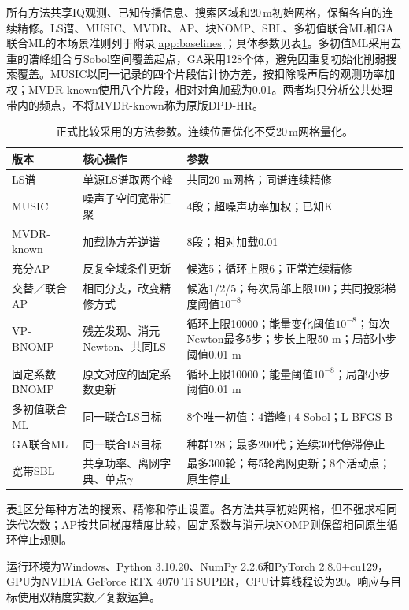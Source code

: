 \documentclass[a4paper,fleqn]{cas-sc}
\numberwithin{equation}{section}
\numberwithin{figure}{section}
\numberwithin{table}{section}
\begin{document}
所有方法共享IQ观测、已知传播信息、搜索区域和20\,m初始网格，保留各自的连续精修。LS谱、MUSIC、MVDR、AP、块NOMP、SBL、多初值联合ML和GA联合ML的本场景准则列于附录\ref{app:baselines}；具体参数见表\ref{tab:parameters}。多初值ML采用去重的谱峰组合与Sobol空间覆盖起点，GA采用128个体，避免因重复初始化削弱搜索覆盖。MUSIC以同一记录的四个片段估计协方差，按扣除噪声后的观测功率加权；MVDR-known使用八个片段，相对对角加载为0.01。两者均只分析公共处理带内的频点，不将MVDR-known称为原版DPD-HR。
\par
\begin{table}[pos=H]\centering\footnotesize
\caption{正式比较采用的方法参数。连续位置优化不受20\,m网格量化。}\label{tab:parameters}
\begin{tabularx}{\linewidth}{@{}p{.18\linewidth}p{.27\linewidth}X@{}}\toprule
版本 & 核心操作 & 参数\\\midrule
LS谱 & 单源LS谱取两个峰 & 共同20 m网格；同谱连续精修\\
MUSIC & 噪声子空间宽带汇聚 & 4段；超噪声功率加权；已知K\\
MVDR-known & 加载协方差逆谱 & 8段；相对加载0.01\\
充分AP & 反复全域条件更新 & 候选5；循环上限6；正常连续精修\\
交替／联合AP & 相同分支，改变精修方式 & 候选1/2/5；每次局部上限100；共同投影梯度阈值$10^{-8}$\\
VP-BNOMP & 残差发现、消元Newton、共同LS & 循环上限10000；能量变化阈值$10^{-8}$；每次Newton最多5步；步长上限50 m；局部小步阈值0.01 m\\
固定系数BNOMP & 原文对应的固定系数更新 & 循环上限10000；能量阈值$10^{-8}$；局部小步阈值0.01 m\\
多初值联合ML & 同一联合LS目标 & 8个唯一初值：4谱峰+4 Sobol；L-BFGS-B\\
GA联合ML & 同一联合LS目标 & 种群128；最多200代；连续30代停滞停止\\
宽带SBL & 共享功率、离网字典、单点$\gamma$ & 最多300轮；每5轮离网更新；8个活动点；原生停止\\
\bottomrule\end{tabularx}\end{table}

\par
表\ref{tab:parameters}区分每种方法的搜索、精修和停止设置。各方法共享初始网格，但不强求相同迭代次数；AP按共同梯度精度比较，固定系数与消元块NOMP则保留相同原生循环停止规则。

运行环境为Windows、Python 3.10.20、NumPy 2.2.6和PyTorch 2.8.0+cu129，GPU为NVIDIA GeForce RTX 4070 Ti SUPER，CPU计算线程设为20。响应与目标使用双精度实数／复数运算。
\end{document}
